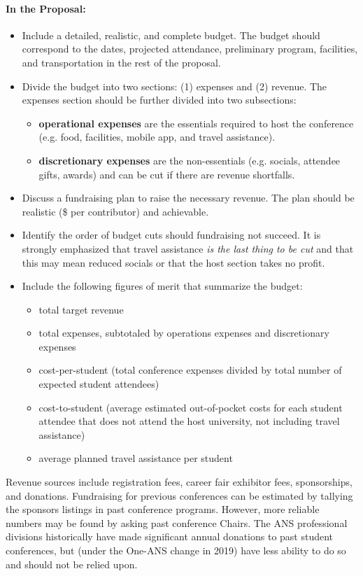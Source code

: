 \documentclass[12pt]{article}
\begin{document}
\paragraph{In the Proposal:}
\begin{itemize}
\item{Include a detailed, realistic, and complete budget. The budget should correspond to the dates, projected attendance, preliminary program, facilities, and transportation in the rest of the proposal.}
\item{Divide the budget into two sections: (1) expenses and (2) revenue. The expenses section should be further divided into two subsections:
\begin{itemize}
\item{\textbf{operational expenses} are the essentials required to host the conference (e.g. food, facilities, mobile app, and travel assistance).}
\item{\textbf{discretionary expenses} are the non-essentials (e.g. socials, attendee gifts, awards) and can be cut if there are revenue shortfalls.}
\end{itemize}
}
\item{Discuss a fundraising plan to raise the necessary revenue. The plan should be realistic (\$ per contributor) and achievable.}
\item{Identify the order of budget cuts should fundraising not succeed. It is strongly emphasized that travel assistance \textit{is the last thing to be cut} and that this may mean reduced socials or that the host section takes no profit.}
\item{Include the following figures of merit that summarize the budget:
\begin{itemize}
\item{total target revenue}
\item{total expenses, subtotaled by operations expenses and discretionary expenses}
\item{cost-per-student (total conference expenses divided by total number of expected student attendees)}
\item{cost-to-student (average estimated out-of-pocket costs for each student attendee that does not attend the host university, not including travel assistance)}
\item{average planned travel assistance per student}
\end{itemize}
}
\end{itemize}

Revenue sources include registration fees, career fair exhibitor fees, sponsorships, and donations. Fundraising for previous conferences can be estimated by tallying the sponsors listings in past conference programs. However, more reliable numbers may be found by asking past conference Chairs. The ANS professional divisions historically have made significant annual donations to past student conferences, but (under the One-ANS change in 2019) have less ability to do so and should not be relied upon.
\end{document}
